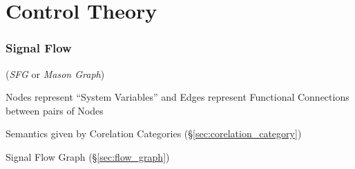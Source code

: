 \part{Control Theory}\label{part:control_theory}

\section{Signal Flow}\label{sec:signal_flow}

(\emph{SFG} or \emph{Mason Graph})

Nodes represent ``System Variables'' and Edges represent Functional
Connections between pairs of Nodes


Semantics given by Corelation Categories
(\S\ref{sec:corelation_category})

Signal Flow Graph (\S\ref{sec:flow_graph})
